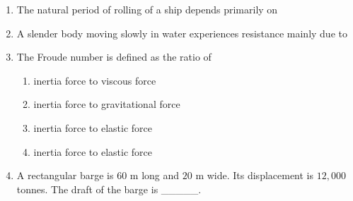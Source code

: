 \documentclass[journal,12pt,onecolumn]{IEEEtran}
\theoremstyle{remark}
\begin{document}
\begin{enumerate}
\item The natural period of rolling of a ship depends primarily on\hfill{}

\begin{enumerate}[label=\Alph*.]
\end{enumerate}

\item A slender body moving slowly in water experiences resistance mainly due to\hfill{}

\begin{enumerate}[label=\Alph*.]
\end{enumerate}

\item The Froude number is defined as the ratio of\hfill{}

\begin{enumerate}[label=\Alph*.]
\item inertia force to viscous force 
\item inertia force to gravitational force
\item inertia force to elastic force 
\item inertia force to elastic force 
\end{enumerate}

\item A rectangular barge is $60$ m long and $20$ m wide.  
Its displacement is $12,000$ tonnes.  
The draft of the barge is \_\_\_\_\_.\hfill{}


\end{enumerate}
\end{document}
